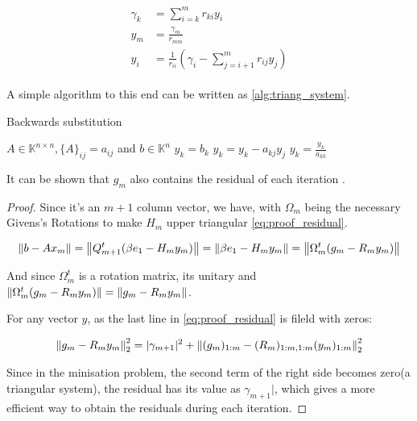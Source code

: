\begin{align}\label{eq:triangular_system}
    \begin{split}
        \gamma_{k} &= \sum_{i=k}^{m} r_{ki} y_{i}\\
        y_{m} &= \frac{\gamma_{m}}{r_{mm}} \\
        y_{i} &= \frac{1}{r_{ii}} \left( \gamma_{i} - \sum_{j=i+1}^{m} r_{ij} y_{j}  \right)
    \end{split}
\end{align}

A simple algorithm to this end can be written as \ref{alg:triang_system}.

\begin{algorithm}
    \caption{Backwards substitution}\label{alg:triang_system}
    \begin{algorithmic}[1]
        \State $A \in \mathbb{K}^{n \times n}, \{ A \}_{ij} = a_{ij}$ and $b\in \mathbb{K}^{n}$
        \State $y_{k} = b_{k}$
        \State $y_{k} = y_{k} - a_{kj}y_{j}$
        \EndFor
        \State $y_{k} = \frac{y_{k}}{a_{kk}}$
        \EndFor
    \end{algorithmic}
\end{algorithm}



It can be shown that $g_{m}$ also contains the residual of each iteration \cite{saad2003iterative}.

\begin{proof}

    Since it's an $m+1$ column vector, we have, with $\Omega_{m}$ being the necessary Givens's Rotations to make $H_{m}$ upper triangular \ref{eq:proof_residual}.


    \begin{equation}\label{eq:proof_residual}
        \left\lVert b - Ax_{m}\right\rVert = \left\lVert Q_{m+1}^{t}(\beta e_{1} - H_{m}y_{m})\right\rVert = \left\lVert\beta e_{1} - H_{m}y_{m}\right\rVert = \left\lVert\Omega_{m}^{t} (g_{m} - R_{m}y_{m})\right\rVert
    \end{equation}

    And since $\Omega_{m}^{t}$ is a rotation matrix, its unitary and $\left\lVert\Omega_{m}^{t} (g_{m} - R_{m}y_{m})\right\rVert=\left\lVert g_{m} - R_{m}y_{m}\right\rVert$.

    For any vector $y$, as the last line in \ref{eq:proof_residual} is fileld with zeros:

    \begin{equation}
        \left\lVert g_{m} - R_{m}y_{m}\right\rVert_{2}^{2} = |\gamma_{m+1}|^{2} + \left\lVert(g_{m})_{1:m} - (R_{m})_{1:m,1:m} (y_{m})_{1:m}\right\rVert_{2}^{2}
    \end{equation}

    Since in the minisation problem, the second term of the right side becomes zero(a triangular system), the residual has its value as $\gamma_{m+1}|$, which gives a more efficient way to obtain the residuals during each iteration.
\end{proof}

